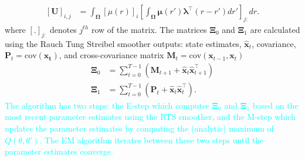 \documentclass[journal,a4paper]{IEEEtran}
\newcommand{\cut}[1]{\textcolor{cyan}{#1}}
\begin{document}
\begin{align}
\left[ \mathbf U\right] _{i,j}&=\int_{\boldsymbol \Omega}\left[\mu(r) \right]_i \left[\int_{\boldsymbol\Omega} \boldsymbol\mu\left(r'\right)\boldsymbol \lambda^\top \left(r-r'\right) dr'\right]_{j:} dr.
\end{align}
where $[.]_{j:} $ denotes $j^{th}$ row of the matrix. The matrices $\boldsymbol\Xi_0$ and $\boldsymbol\Xi_1$ are calculated using the Rauch Tung Streibel smoother \cite{RAUCH1965} outputs: state estimates, $\hat{\mathbf x}_t$, covariance, $\mathbf P_t=\mathrm{cov}(\mathbf{x_t})$, and cross-covariance matrix $\mathbf M_t=\mathrm{cov}(\mathbf{x}_{t-1},\mathbf{x}_{t})$ \cite{Gibsona2005}
\begin{align}\label{eq:Xivariables}
\boldsymbol\Xi_0&=\sum_{t=0}^{T-1}\left(\mathbf M_{t+1}+\mathbf{\hat x}_t\mathbf{\hat x}_{t+1}^\top\right) \\
 \boldsymbol\Xi_1&=\sum_{t=0}^{T-1}\left(\mathbf P_t+\mathbf{\hat x}_t\mathbf{\hat x}_t^\top\right).
\end{align}
 \cut{The algorithm has two steps: the E-step which computes $\boldsymbol\Xi_0$ and $\boldsymbol\Xi_1$ based on the most recent parameter estimates using the RTS smoother, and the M-step which updates the parameter estimates by computing the (analytic) maximum of $Q(\theta,\theta')$. The EM algorithm iterates between these two steps until the parameter estimates converge.} 
\end{document}
